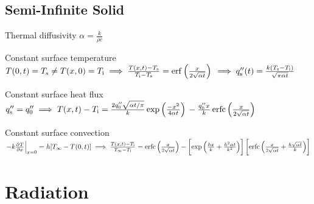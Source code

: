 \documentclass{article}
\begin{document}
\begin{multicols}{2}
\subsection{Semi-Infinite Solid}
\begin{description*}
  \item[Thermal diffusivity]
    \(\alpha = \frac{k}{\rho c}\)
  \item[Constant surface temperature]~\\
    \(T(0,t) = T_\mathrm{s} \neq T(x,0) = T_\mathrm{i} \\
    \implies \frac{T(x,t)-T_\mathrm{s}}{T_\mathrm{i}-T_\mathrm{s}}
    = \operatorname{erf}\left(\frac{x}{2\sqrt{\alpha t}}\right) \\
    \implies q''_\mathrm{s}(t) = \frac{k(T_\mathrm{s}-T_\mathrm{i})}{\sqrt{\pi\alpha t}}\)
  \item[Constant surface heat flux]
    \(q''_\mathrm{s} = q''_0 \\
    \implies T(x,t)-T_\mathrm{i}
    = \frac{2q''_0\sqrt{\alpha t/\pi}}{k}\exp\left(\frac{-x^2}{4\alpha t}\right) \\
    - \frac{q''_0x}{k}\operatorname{erfc}\left(\frac{x}{2\sqrt{\alpha t}}\right)\)
  \item[Constant surface convection]~\\
    \(\left.-k\pd{T}{x}\right|_{x=0} = h[T_\infty-T(0,t)]
    \implies \frac{T(x,t)-T_\mathrm{i}}{T_\infty-T_\mathrm{i}} \\
      = \erfc\left(\frac{x}{2\sqrt{\alpha t}}\right)
      - \left[\exp\left(\frac{hx}{k}+\frac{h^2\alpha t}{k^2}\right)\right]
      \left[\erfc\left(\frac{x}{2\sqrt{\alpha t}}+\frac{h\sqrt{\alpha t}}{k}\right)\right]\)
\end{description*}

\end{multicols}

\section{Radiation}
\label{sec:radiation}
\end{document}
